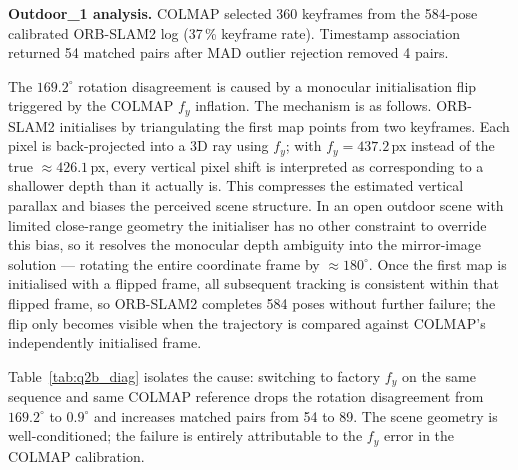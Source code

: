 \documentclass[twocolumn,10pt,a4paper]{article}
\begin{document}
\textbf{Outdoor\_1 analysis.}
COLMAP selected 360 keyframes from the 584-pose calibrated
ORB-SLAM2 log (37\,\% keyframe rate). Timestamp association
returned 54 matched pairs after MAD outlier rejection removed 4
pairs.

The $169.2^{\circ}$ rotation disagreement is caused by a
monocular initialisation flip triggered by the COLMAP $f_y$
inflation. The mechanism is as follows. ORB-SLAM2 initialises by
triangulating the first map points from two keyframes. Each pixel
is back-projected into a 3D ray using $f_y$; with
$f_y = 437.2$\,px instead of the true $\approx 426.1$\,px, every
vertical pixel shift is interpreted as corresponding to a shallower
depth than it actually is. This compresses the estimated vertical
parallax and biases the perceived scene structure. In an open
outdoor scene with limited close-range geometry the initialiser has
no other constraint to override this bias, so it resolves the
monocular depth ambiguity into the mirror-image solution ---
rotating the entire coordinate frame by $\approx 180^{\circ}$.
Once the first map is initialised with a flipped frame, all
subsequent tracking is consistent within that flipped frame, so
ORB-SLAM2 completes 584 poses without further failure; the flip
only becomes visible when the trajectory is compared against
COLMAP's independently initialised frame.

\begin{table}[H]
\centering\scriptsize
\caption{Outdoor\_1 diagnostic: calibrated vs.\ factory intrinsics.}
\label{tab:q2b_diag}
\end{table}

Table~\ref{tab:q2b_diag} isolates the cause: switching to factory
$f_y$ on the same sequence and same COLMAP reference drops the
rotation disagreement from $169.2^{\circ}$ to $0.9^{\circ}$
and increases matched pairs from 54 to 89. The scene geometry is
well-conditioned; the failure is entirely attributable to the
$f_y$ error in the COLMAP calibration.
\end{document}
